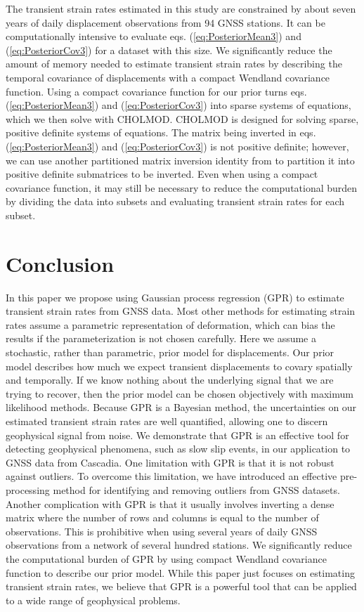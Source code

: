 \documentclass[10pt,letter]{article}
\begin{document}
The transient strain rates estimated in this study are constrained by about seven years of daily displacement observations from 94 GNSS stations. It can be computationally intensive to evaluate eqs. (\ref{eq:PosteriorMean3}) and (\ref{eq:PosteriorCov3}) for a dataset with this size. We significantly reduce the amount of memory needed to estimate transient strain rates by describing the temporal covariance of displacements with a compact Wendland covariance function. Using a compact covariance function for our prior turns eqs. (\ref{eq:PosteriorMean3}) and (\ref{eq:PosteriorCov3}) into sparse systems of equations, which we then solve with CHOLMOD. CHOLMOD is designed for solving sparse, positive definite systems of equations. The matrix being inverted in eqs. (\ref{eq:PosteriorMean3}) and (\ref{eq:PosteriorCov3}) is not positive definite; however, we can use another partitioned matrix inversion identity from \citet{Press2007} to partition it into positive definite submatrices to be inverted. Even when using a compact covariance function, it may still be necessary to reduce the computational burden by dividing the data into subsets and evaluating transient strain rates for each subset.   

\section{Conclusion}\label{sec:Conclusion}
In this paper we propose using Gaussian process regression (GPR) to estimate transient strain rates from GNSS data. Most other methods for estimating strain rates assume a parametric representation of deformation, which can bias the results if the parameterization is not chosen carefully. Here we assume a stochastic, rather than parametric, prior model for displacements. Our prior model describes how much we expect transient displacements to covary spatially and temporally. If we know nothing about the underlying signal that we are trying to recover, then the prior model can be chosen objectively with maximum likelihood methods. Because GPR is a Bayesian method, the uncertainties on our estimated transient strain rates are well quantified, allowing one to discern geophysical signal from noise. We demonstrate that GPR is an effective tool for detecting geophysical phenomena, such as slow slip events, in our application to GNSS data from Cascadia. One limitation with GPR is that it is not robust against outliers. To overcome this limitation, we have introduced an effective pre-processing method for identifying and removing outliers from GNSS datasets. Another complication with GPR is that it usually involves inverting a dense matrix where the number of rows and columns is equal to the number of observations. This is prohibitive when using several years of daily GNSS observations from a network of several hundred stations. We significantly reduce the computational burden of GPR by using compact Wendland covariance function to describe our prior model. While this paper just focuses on estimating transient strain rates, we believe that GPR is a powerful tool that can be applied to a wide range of geophysical problems.   
\end{document}
